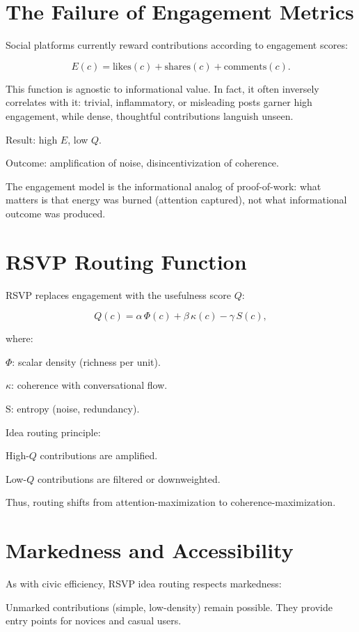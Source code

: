 \documentclass{book}
\begin{document}
\section{The Failure of Engagement Metrics}

Social platforms currently reward contributions according to engagement scores:

\[ E(c) = \text{likes}(c) + \text{shares}(c) + \text{comments}(c). \]

This function is agnostic to informational value. In fact, it often inversely correlates with it: trivial, inflammatory, or misleading posts garner high engagement, while dense, thoughtful contributions languish unseen.

Result: high \( E \), low \( Q \).

Outcome: amplification of noise, disincentivization of coherence.

The engagement model is the informational analog of proof-of-work: what matters is that energy was burned (attention captured), not what informational outcome was produced.

\section{RSVP Routing Function}

RSVP replaces engagement with the usefulness score \( Q \):

\[ Q(c) = \alpha \, \Phi(c) + \beta \, \kappa(c) - \gamma \, S(c), \]

where:

\(\Phi\): scalar density (richness per unit).

\(\kappa\): coherence with conversational flow.

S: entropy (noise, redundancy).

Idea routing principle:

High-\( Q \) contributions are amplified.

Low-\( Q \) contributions are filtered or downweighted.

Thus, routing shifts from attention-maximization to coherence-maximization.

\section{Markedness and Accessibility}

As with civic efficiency, RSVP idea routing respects markedness:

Unmarked contributions (simple, low-density) remain possible. They provide entry points for novices and casual users.
\end{document}
